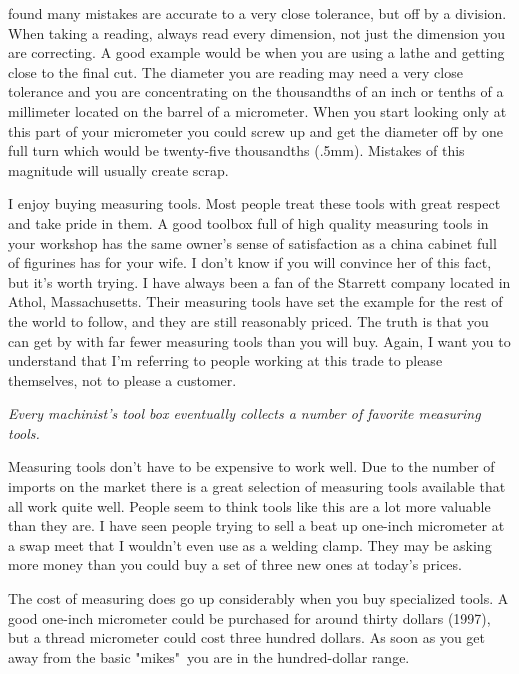 found many mistakes are accurate to a very close tolerance, but off by a
division. When taking a reading, always read every dimension, not just the
dimension you are correcting. A good example would be when you are using a lathe
and getting close to the final cut. The diameter you are reading may need a very
close tolerance and you are concentrating on the thousandths of an inch or
tenths of a millimeter located on the barrel of a micrometer. When you start
looking only at this part of your micrometer you could screw up and get the
diameter off by one full turn which would be twenty-five thousandths (.5mm).
Mistakes of this magnitude will usually create scrap.


I enjoy buying measuring tools. Most people treat these tools with great respect
and take pride in them. A good toolbox full of high quality measuring tools in
your workshop has the same owner's sense of satisfaction as a china cabinet full
of figurines has for your wife. I don't know if you will convince her of this
fact, but it's worth trying. I have always been a fan of the Starrett company
located in Athol, Massachusetts. Their measuring tools have set the example for
the rest of the world to follow, and they are still reasonably priced. The truth
is that you can get by with far fewer measuring tools than you will buy. Again,
I want you to understand that I'm referring to people working at this trade to
please themselves, not to please a customer.

\bigskip
\textit{Every machinist's tool box eventually collects a number of favorite
measuring tools.}
\bigskip

Measuring tools don't have to be expensive to work well. Due to the number of
imports on the market there is a great selection of measuring tools available
that all work quite well. People seem to think tools like this are a lot more
valuable than they are. I have seen people trying to sell a beat up one-inch
micrometer at a swap meet that I wouldn't even use as a welding clamp. They may
be asking more money than you could buy a set of three new ones at today's
prices.

The cost of measuring does go up considerably when you buy specialized tools. A
good one-inch micrometer could be purchased for around thirty dollars (1997),
but a thread micrometer could cost three hundred dollars. As soon as you get
away from the basic "mikes"\ you are in the hundred-dollar range.

